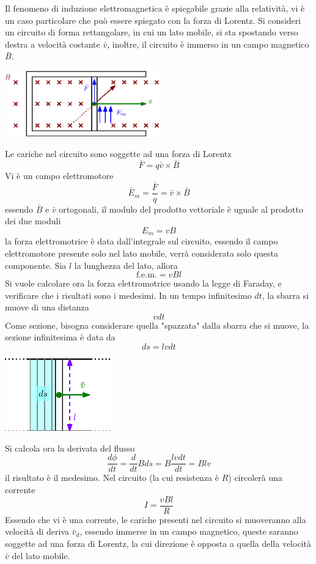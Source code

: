 \documentclass[10pt, letterpaper]{report}
\begin{document}
Il fenomeno di induzione elettromagnetica è spiegabile grazie alla relatività, vi è un  caso particolare che può essere spiegato con la forza di Lorentz.\acc 
Si consideri un circuito di forma rettangolare, in cui un lato mobile, si sta spostando verso destra a velocità costante $\bar v$, inoltre, il circuito è immerso in un campo magnetico $\bar B$.
\begin{center}
    \includegraphics[width=0.5\textwidth ]{images/sbarra1.eps}
\end{center}
Le cariche nel circuito sono soggette ad una forza di Lorentz $$ \bar F = q\bar v \times \bar B  $$
Vi è un campo elettromotore 
$$ \bar E_m=\frac{\bar F}{q}=\bar v \times \bar B$$
essendo $\bar B$ e $\bar v$ ortogonali, il modulo del prodotto vettoriale è uguale al prodotto dei due moduli 
$$ E_m=vB$$
la forza elettromotrice è data dall'integrale sul circuito, essendo il campo elettromotore presente solo nel lato mobile, verrà considerata solo questa componente. Sia $l$ la lunghezza del lato, allora 
$$ \text{f.e.m.}=vBl$$
Si vuole calcolare ora la forza elettromotrice usando la legge di Faraday, e verificare che i risultati sono i medesimi. In un tempo infinitesimo $dt$, la sbarra si muove di una distanza $$ vdt$$
Come sezione, bisogna considerare quella "spazzata" dalla sbarra che si muove, la sezione infinitesima è data da 
$$ ds=lvdt$$
\begin{center}
    \includegraphics[width=0.35\textwidth ]{images/sbarra2.eps}
\end{center}
Si calcola ora la derivata del flusso
$$ \frac{d\phi}{dt}=\frac{d}{dt}Bds=B\frac{lvdt}{dt}=Blv$$
il risultato è il medesimo. Nel circuito (la cui resistenza è $R$) circolerà una corrente 
$$ I=\frac{vBl}{R}$$
Essendo che vi è una corrente, le cariche presenti nel circuito si muoveranno alla velocità di deriva $\bar v_d$, essendo immerse in un campo magnetico, queste saranno soggette ad una forza di Lorentz, la cui direzione è opposta a quella della velocità $\bar v$ del lato mobile.\acc 
\end{document}
